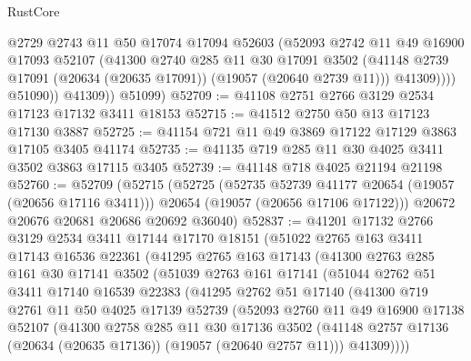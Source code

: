 \begin{lexlean}{RustCore}
\begin{coremodule}
                  @2729
                  @2743
                  @11
                  @50
                  @17074
                  @17094
                  @52603
                  (@52093
                    @2742
                    @11
                    @49
                    @16900
                    @17093
                    @52107
                    (@41300
                      @2740
                      @285
                      @11
                      @30
                      @17091
                      @3502
                      (@41148 @2739 @17091 (@20634 (@20635 @17091)) (@19057 (@20640 @2739 @11)))
                      @41309))))
              @51090))
          @41309))
      @51099)
@52709 := @41108 @2751 @2766 @3129 @2534 @17123 @17132 @3411 @18153
@52715 := @41512 @2750 @50 @13 @17123 @17130 @3887
@52725 := @41154 @721 @11 @49 @3869 @17122 @17129 @3863 @17105 @3405 @41174
@52735 := @41135 @719 @285 @11 @30 @4025 @3411 @3502 @3863 @17115 @3405
@52739 := @41148 @718 @4025 @21194 @21198
@52760 := @52709
    (@52715
      (@52725
        (@52735 @52739 @41177 @20654 (@19057 (@20656 @17116 @3411)))
        @20654
        (@19057 (@20656 @17106 @17122)))
      @20672
      @20676
      @20681
      @20686
      @20692
      @36040)
@52837 := @41201
    @17132
    @2766
    @3129
    @2534
    @3411
    @17144
    @17170
    @18151
    (@51022
      @2765
      @163
      @3411
      @17143
      @16536
      @22361
      (@41295
        @2765
        @163
        @17143
        (@41300
          @2763
          @285
          @161
          @30
          @17141
          @3502
          (@51039
            @2763
            @161
            @17141
            (@51044
              @2762
              @51
              @3411
              @17140
              @16539
              @22383
              (@41295
                @2762
                @51
                @17140
                (@41300
                  @719
                  @2761
                  @11
                  @50
                  @4025
                  @17139
                  @52739
                  (@52093
                    @2760
                    @11
                    @49
                    @16900
                    @17138
                    @52107
                    (@41300
                      @2758
                      @285
                      @11
                      @30
                      @17136
                      @3502
                      (@41148 @2757 @17136 (@20634 (@20635 @17136)) (@19057 (@20640 @2757 @11)))
                      @41309))))

\end{coremodule}
\end{lexlean}

